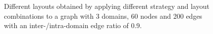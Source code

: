 {\begin{figure}[p]
\begin{adjustwidth}{0cm}{0cm}
{    }\\
    \\
  \end{adjustwidth}
  \caption[Different layouts for a graph with 3 domains, 60 nodes and 200 edges with a inter-/intra-domain edge ratio of 95\%.]{Different layouts obtained by applying different strategy and layout combinations to a graph with 3 domains, 60 nodes and 200 edges with an inter-/intra-domain edge ratio of 0.9.}%
  \label{fig:ex1}
\end{figure}
  \cleartoodd
}

